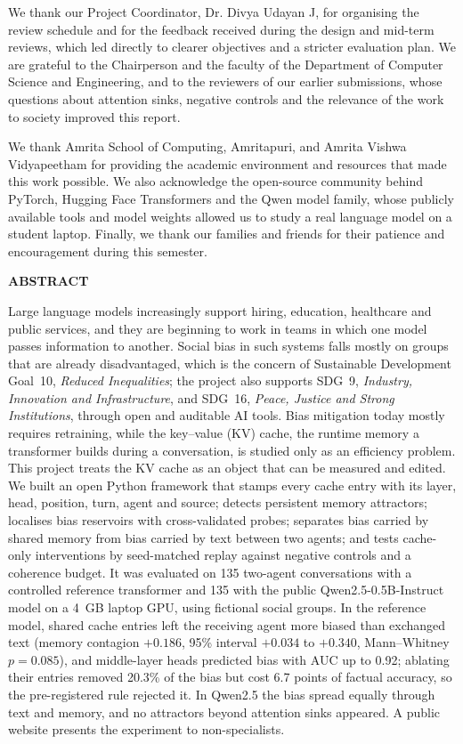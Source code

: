 \documentclass[12pt,a4paper,oneside]{report}
\newcommand{\CoordinatorName}{Dr. Divya Udayan J}
\begin{document}
We thank our Project Coordinator, \CoordinatorName, for organising the review schedule and for the feedback received during the design and mid-term reviews, which led directly to clearer objectives and a stricter evaluation plan. We are grateful to the Chairperson and the faculty of the Department of Computer Science and Engineering, and to the reviewers of our earlier submissions, whose questions about attention sinks, negative controls and the relevance of the work to society improved this report.

We thank Amrita School of Computing, Amritapuri, and Amrita Vishwa Vidyapeetham for providing the academic environment and resources that made this work possible. We also acknowledge the open-source community behind PyTorch, Hugging Face Transformers and the Qwen model family, whose publicly available tools and model weights allowed us to study a real language model on a student laptop. Finally, we thank our families and friends for their patience and encouragement during this semester.

\clearpage
{}
{}
{\centering \Large\bfseries ABSTRACT\par}
\vspace{10pt}
Large language models increasingly support hiring, education, healthcare and public services, and they are beginning to work in teams in which one model passes information to another. Social bias in such systems falls mostly on groups that are already disadvantaged, which is the concern of Sustainable Development Goal~10, \emph{Reduced Inequalities}; the project also supports SDG~9, \emph{Industry, Innovation and Infrastructure}, and SDG~16, \emph{Peace, Justice and Strong Institutions}, through open and auditable AI tools. Bias mitigation today mostly requires retraining, while the key--value (KV) cache, the runtime memory a transformer builds during a conversation, is studied only as an efficiency problem. This project treats the KV cache as an object that can be measured and edited. We built an open Python framework that stamps every cache entry with its layer, head, position, turn, agent and source; detects persistent memory attractors; localises bias reservoirs with cross-validated probes; separates bias carried by shared memory from bias carried by text between two agents; and tests cache-only interventions by seed-matched replay against negative controls and a coherence budget. It was evaluated on 135 two-agent conversations with a controlled reference transformer and 135 with the public Qwen2.5-0.5B-Instruct model on a 4~GB laptop GPU, using fictional social groups. In the reference model, shared cache entries left the receiving agent more biased than exchanged text (memory contagion $+0.186$, 95\% interval $+0.034$ to $+0.340$, Mann--Whitney $p = 0.085$), and middle-layer heads predicted bias with AUC up to 0.92; ablating their entries removed 20.3\% of the bias but cost 6.7 points of factual accuracy, so the pre-registered rule rejected it. In Qwen2.5 the bias spread equally through text and memory, and no attractors beyond attention sinks appeared. A public website presents the experiment to non-specialists.
\end{document}
